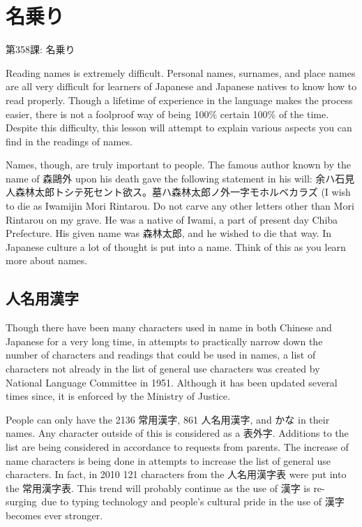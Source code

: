     
\chapter{名乗り}

\begin{center}
\begin{Large}
第358課: 名乗り 
\end{Large}
\end{center}
 
\par{ Reading names is extremely difficult. Personal names, surnames, and place names are all very difficult for learners of Japanese and Japanese natives to know how to read properly. Though a lifetime of experience in the language makes the process easier, there is not a foolproof way of being 100\% certain 100\% of the time. Despite this difficulty, this lesson will attempt to explain various aspects you can find in the readings of names. }

\par{ Names, though, are truly important to people. The famous author known by the name of 森鷗外 upon his death gave the following statement in his will: 余ハ石見人森林太郎トシテ死セント欲ス。墓ハ森林太郎ノ外一字モホルベカラズ (I wish to die as Iwamijin Mori Rintarou. Do not carve any other letters other than Mori Rintarou on my grave. He was a native of Iwami, a part of present day Chiba Prefecture. His given name was 森林太郎, and he wished to die that way. In Japanese culture a lot of thought is put into a name. Think of this as you learn more about names. }
      
\section{人名用漢字}
 
\par{ Though there have been many characters used in name in both Chinese and Japanese for a very long time, in attempts to practically narrow down the number of characters and readings that could be used in names, a list of characters not already in the list of general use characters was created by National Language Committee in 1951. Although it has been updated several times since, it is enforced by the Ministry of Justice. }

\par{ People can only have the 2136 常用漢字, 861 人名用漢字, and かな in their names. Any character outside of this is considered as a 表外字. Additions to the list are being considered in accordance to requests from parents. The increase of name characters is being done in attempts to increase the list of general use characters. In fact, in 2010 121 characters from the 人名用漢字表 were put into the 常用漢字表. This trend will probably continue as the use of 漢字 is re-surging due to typing technology and people's cultural pride in the use of 漢字 becomes ever stronger. }

